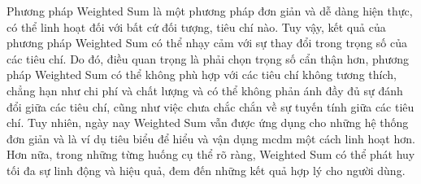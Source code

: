 Phương pháp Weighted Sum là một phương pháp đơn giản và dễ dàng hiện thực, có thể linh hoạt đối với bất cứ đối tượng, tiêu chí nào. Tuy vậy, kết quả của phương pháp Weighted Sum có thể nhạy cảm với sự thay đổi trong trọng số của các tiêu chí. Do đó, điều quan trọng là phải chọn trọng số cẩn thận hơn, phương pháp Weighted Sum có thể không phù hợp với các tiêu chí không tương thích, chẳng hạn như chi phí và chất lượng và có thể không phản ánh đầy đủ sự đánh đổi giữa các tiêu chí, cũng như việc chưa chắc chắn về sự tuyến tính giữa các tiêu chí. Tuy nhiên, ngày nay Weighted Sum vẫn được ứng dụng cho những hệ thống đơn giản và là ví dụ tiêu biểu để hiểu và vận dụng \acrshort{mcdm} một cách linh hoạt hơn. Hơn nữa, trong những từng huống cụ thể rõ ràng, Weighted Sum có thể phát huy tối đa sự linh động và hiệu quả, đem đến những kết quả hợp lý cho người dùng.


